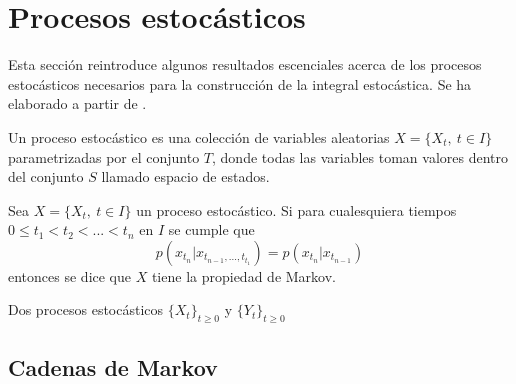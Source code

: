 \section{Procesos estocásticos}

Esta sección reintroduce algunos resultados escenciales acerca de 
los procesos estocásticos necesarios para la construcción de la integral
estocástica. Se ha elaborado a partir de 
\cite{rinconIntroduccionProcesosEstocasticos2012,dobrowIntroductionStochasticProcesses2016}.

\begin{definition}\label{def:proceso_estocastico}
    Un proceso estocástico es una colección de variables
    aleatorias $X = \{X_t,\ t\in I\}$ parametrizadas por el
    conjunto $T$, donde todas las variables toman valores
    dentro del conjunto $S$ llamado espacio de estados. 
\end{definition}



\begin{definition}
    Sea $X = \{X_t,\ t\in I\}$ un proceso estocástico. Si 
    para cualesquiera tiempos $0\leq t_1<t_2<...<t_n$
    en $I$ se cumple que 
    $$p(x_{t_n}|x_{t_{n-1},...,t_{t_1}})=p(x_{t_n}|x_{t_{n-1}})$$
    entonces se dice que $X$ tiene la propiedad de Markov.
\end{definition}

\begin{definition}
    Dos procesos estocásticos $\{X_t\}_{t\geq 0}$ y 
    $\{Y_t\}_{t\geq 0}$
\end{definition}

\subsection{Cadenas de Markov}

